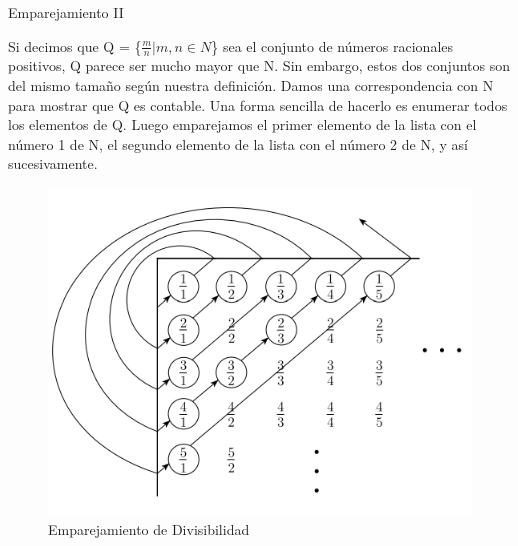 \documentclass[11pt]{beamer}
\begin{document}
		
		\begin{frame}{Emparejamiento II}
			\begin{multicols}{2}
		        \justifying
                Si decimos que Q = \{$  \frac{m}{n}|m, n \in N$\} sea el
                conjunto de números racionales positivos, Q parece ser mucho mayor que N. Sin embargo, estos dos conjuntos son del mismo tamaño según nuestra definición. Damos una correspondencia con N para mostrar que Q es contable. Una forma sencilla de hacerlo es enumerar todos los elementos de Q. Luego emparejamos el primer elemento de la lista con el número 1 de N, el segundo elemento de la lista con el número 2 de N, y así sucesivamente.
                
                \columnbreak
                
                \begin{figure}[H]
    				\centering
    				\includegraphics[scale=0.4]{img/inde_emparejam_2.png}
    				\caption{Emparejamiento de Divisibilidad}
    				\label{fig: inde_emparejam_2}
    			\end{figure}
                
            \end{multicols}
		\end{frame}
		
\end{document}
